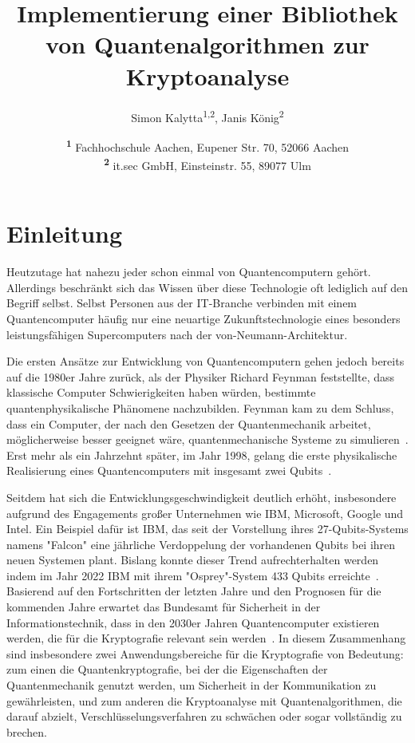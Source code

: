\documentclass[
  a4paper, %
  10pt, %
  unnumberedsections, %
  twoside, %
]{LTJournalArticle}
\title{Implementierung einer Bibliothek von Quantenalgorithmen zur Kryptoanalyse} %
\author{%
  Simon Kalytta\textsuperscript{1,2}, Janis König\textsuperscript{2}
}
\date{%
  \footnotesize\textsuperscript{\textbf{1}}%
  Fachhochschule Aachen, 
  Eupener Str. 70, 52066 Aachen\\
  \textsuperscript{\textbf{2}}%
  it.sec GmbH,
  Einsteinstr. 55, 89077 Ulm%
}
\begin{document}
\maketitle %


\section{Einleitung}

Heutzutage hat nahezu jeder schon einmal von Quantencomputern gehört.
Allerdings beschränkt sich das Wissen über diese Technologie oft lediglich auf den Begriff selbst.
Selbst Personen aus der IT-Branche verbinden mit einem Quantencomputer häufig nur
eine neuartige Zukunftstechnologie eines besonders leistungsfähigen Supercomputers nach der von-Neumann-Architektur.

Die ersten Ansätze zur Entwicklung von Quantencomputern gehen jedoch bereits auf die 1980er Jahre zurück,
als der Physiker Richard Feynman feststellte,
dass klassische Computer Schwierigkeiten haben würden,
bestimmte quantenphysikalische Phänomene nachzubilden.
Feynman kam zu dem Schluss, dass ein Computer,
der nach den Gesetzen der Quantenmechanik arbeitet,
möglicherweise besser geeignet wäre,
quantenmechanische Systeme zu simulieren~\autocite{Feynman:1982}.
Erst mehr als ein Jahrzehnt später, im Jahr 1998,
gelang die erste physikalische Realisierung eines Quantencomputers
mit insgesamt zwei Qubits~\autocite{Chuang:1998ExperimentalIO}.

Seitdem hat sich die Entwicklungsgeschwindigkeit deutlich erhöht,
insbesondere aufgrund des Engagements großer Unternehmen wie IBM, Microsoft, Google und Intel.
Ein Beispiel dafür ist IBM,
das seit der Vorstellung ihres 27-Qubits-Systems namens "Falcon"
eine jährliche Verdoppelung der vorhandenen Qubits bei ihren neuen Systemen plant.
Bislang konnte dieser Trend aufrechterhalten werden
indem im Jahr 2022 IBM mit ihrem "Osprey"-System 433 Qubits erreichte~\autocite{IBM:2022}.
Basierend auf den Fortschritten der letzten Jahre und
den Prognosen für die kommenden Jahre erwartet
das Bundesamt für Sicherheit in der Informationstechnik,
dass in den 2030er Jahren Quantencomputer existieren werden,
die für die Kryptografie relevant sein werden~\autocite{BSI:2023}.
In diesem Zusammenhang sind insbesondere zwei Anwendungsbereiche für die Kryptografie von Bedeutung:
zum einen die Quantenkryptografie, bei der die Eigenschaften der Quantenmechanik genutzt werden,
um Sicherheit in der Kommunikation zu gewährleisten, und
zum anderen die Kryptoanalyse mit Quantenalgorithmen, die darauf abzielt,
Verschlüsselungsverfahren zu schwächen oder sogar vollständig zu brechen.
\end{document}
